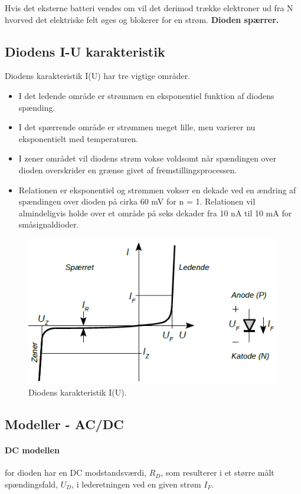 \documentclass[danish]{article}
\begin{document}
Hvis det eksterne batteri vendes om vil det derimod trække
elektroner ud fra N hvorved det elektriske felt øges og blokerer for en strøm. \textbf{Dioden spærrer.}

\subsection{Diodens I-U karakteristik}
Diodens karakteristik I(U) har tre vigtige områder. 
\begin{itemize}
	\item I det ledende område er strømmen en eksponentiel funktion af diodens spænding.
	\item I det spærrende område er strømmen meget lille, men varierer nu eksponentielt med temperaturen. 
	\item I zener området vil diodens strøm vokse voldsomt når spændingen over dioden overskrider en grænse givet af fremstillingsprocessen.
	\item Relationen er eksponentiel og strømmen vokser en dekade
	ved en ændring af spændingen over dioden på cirka 60 mV for n = 1. Relationen vil almindeligvis holde over et område på seks dekader fra 10 nA til 10 mA for småsignaldioder.
\end{itemize}

\begin{figure} [H]
	\centering
	\includegraphics[width=0.9\linewidth]{graphics/I-U_karakteristik}
	\caption{Diodens karakteristik I(U).}
	\label{fig:I-U_karakteristik}
\end{figure}

\subsection{Modeller - AC/DC}
\paragraph{DC modellen} for dioden har en DC modstandsværdi, $R_D$, som resulterer i et større målt spændingsfald, $U_D$, i lederetningen ved en given strøm $I_F$.
\end{document}
